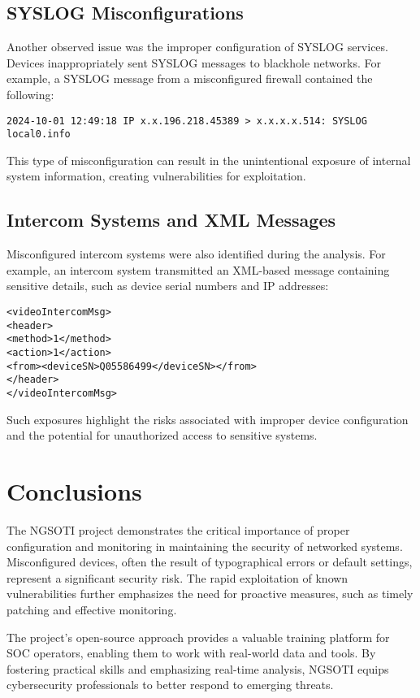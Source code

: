 \section{SYSLOG Misconfigurations}
Another observed issue was the improper configuration of SYSLOG services. Devices inappropriately sent SYSLOG messages to blackhole networks. For example, a SYSLOG message from a misconfigured firewall contained the following:
\begin{verbatim}
2024-10-01 12:49:18 IP x.x.196.218.45389 > x.x.x.x.514: SYSLOG local0.info
\end{verbatim}
This type of misconfiguration can result in the unintentional exposure of internal system information, creating vulnerabilities for exploitation.

\section{Intercom Systems and XML Messages}
Misconfigured intercom systems were also identified during the analysis. For example, an intercom system transmitted an XML-based message containing sensitive details, such as device serial numbers and IP addresses:
\begin{verbatim}
<videoIntercomMsg>
<header>
<method>1</method>
<action>1</action>
<from><deviceSN>Q05586499</deviceSN></from>
</header>
</videoIntercomMsg>
\end{verbatim}
Such exposures highlight the risks associated with improper device configuration and the potential for unauthorized access to sensitive systems.

\chapter{Conclusions}
The NGSOTI project demonstrates the critical importance of proper configuration and monitoring in maintaining the security of networked systems. Misconfigured devices, often the result of typographical errors or default settings, represent a significant security risk. The rapid exploitation of known vulnerabilities further emphasizes the need for proactive measures, such as timely patching and effective monitoring.

The project's open-source approach provides a valuable training platform for SOC operators, enabling them to work with real-world data and tools. By fostering practical skills and emphasizing real-time analysis, NGSOTI equips cybersecurity professionals to better respond to emerging threats.


